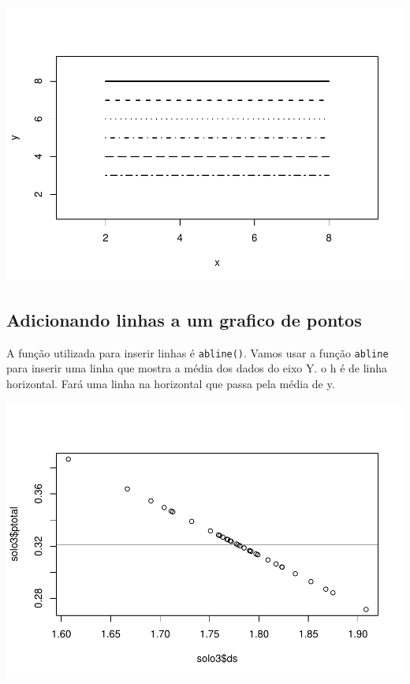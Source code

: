 \documentclass[]{book}
\newenvironment{Shaded}{\begin{snugshade}}{\end{snugshade}}
\newcommand{\DataTypeTok}[1]{\textcolor[rgb]{0.13,0.29,0.53}{#1}}
\newcommand{\KeywordTok}[1]{\textcolor[rgb]{0.13,0.29,0.53}{\textbf{#1}}}
\newcommand{\NormalTok}[1]{#1}
\newcommand{\OperatorTok}[1]{\textcolor[rgb]{0.81,0.36,0.00}{\textbf{#1}}}
\begin{document}
\includegraphics{TudodoR_files/figure-latex/unnamed-chunk-159-1.pdf}

\hypertarget{adicionando-linhas-a-um-grafico-de-pontos}{%
\subsection{Adicionando linhas a um grafico de pontos}\label{adicionando-linhas-a-um-grafico-de-pontos}}

A função utilizada para inserir linhas é \texttt{abline()}.
Vamos usar a função \texttt{abline} para inserir uma linha que mostra a média dos dados do eixo Y.
o h é de linha horizontal. Fará uma linha na horizontal que passa pela média de y.

\begin{Shaded}
\end{Shaded}

\includegraphics{TudodoR_files/figure-latex/unnamed-chunk-160-1.pdf}
\end{document}
